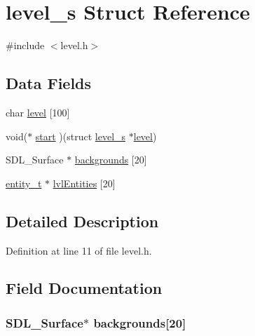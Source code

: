 \hypertarget{structlevel__s}{}\section{level\+\_\+s Struct Reference}
\label{structlevel__s}


{\ttfamily \#include $<$level.\+h$>$}

\subsection*{Data Fields}
\begin{DoxyCompactItemize}
\item 
char \hyperlink{structlevel__s_ae5466280972a960438b11876835dcfce}{level} \mbox{[}100\mbox{]}
\item 
void($\ast$ \hyperlink{structlevel__s_ae165fdb01b6e5fc3cc11102430d82bc2}{start} )(struct \hyperlink{structlevel__s}{level\+\_\+s} $\ast$\hyperlink{structlevel__s_ae5466280972a960438b11876835dcfce}{level})
\item 
S\+D\+L\+\_\+\+Surface $\ast$ \hyperlink{structlevel__s_a0a80ae08633cb7f21e08bd7498ed5aa0}{backgrounds} \mbox{[}20\mbox{]}
\item 
\hyperlink{entity_8h_a01f4cf4c936b7ebadc3339bf8b679aa6}{entity\+\_\+t} $\ast$ \hyperlink{structlevel__s_a0c5197f36b7846057846ac14b04f1905}{lvl\+Entities} \mbox{[}20\mbox{]}
\end{DoxyCompactItemize}


\subsection{Detailed Description}


Definition at line 11 of file level.\+h.



\subsection{Field Documentation}
\hypertarget{structlevel__s_a0a80ae08633cb7f21e08bd7498ed5aa0}{}
\subsubsection[{backgrounds}]{\setlength{\rightskip}{0pt plus 5cm}S\+D\+L\+\_\+\+Surface$\ast$ backgrounds\mbox{[}20\mbox{]}}\label{structlevel__s_a0a80ae08633cb7f21e08bd7498ed5aa0}


